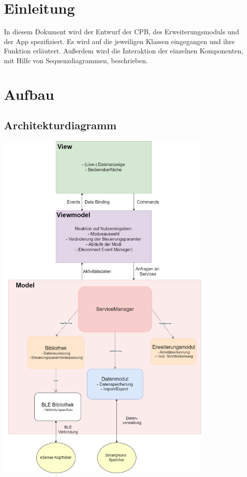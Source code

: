 \documentclass[a4paper,12pt]{article}
\title{\projektName}
\date{\today}
\author{Tec O'Brain}
\begin{document}
 \setcounter{page}{2}
 \tableofcontents          %
 \clearpage

\section{Einleitung}
In diesem Dokument wird der Entwurf der \Gls{CPB}, des Erweiterungsmoduls und der App spezifiziert. Es wird auf die jeweiligen Klassen eingegangen und ihre Funktion erläutert. Außerdem wird die Interaktion der einzelnen Komponenten, mit Hilfe von Sequenzdiagrammen, beschrieben.

\section{Aufbau}
	\subsection{Architekturdiagramm}
	\begin{center}
		\includegraphics[width=0.8\textwidth]{./Diagramme/ArchitekturdiagrammmitServiceManager.png}
	\end{center}
	\clearpage %
\end{document}
